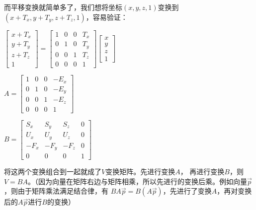 \documentclass[UTF8]{ctexart}
\begin{document}
而平移变换就简单多了，我们想将坐标$(x, y, z, 1)$变换到$(x+T_x, y+T_y, z+T_z, 1)$，容易验证：

$\begin{bmatrix} x+T_x \\ y+T_y \\ z+T_z \\ 1 \end{bmatrix} = \begin{bmatrix}
    1 & 0 & 0 & T_x \\ 
    0 & 1 & 0 & T_y \\ 
    0 & 0 & 1 & T_z \\ 
    0 & 0 & 0 & 1 
    \end{bmatrix} \begin{bmatrix} x \\ y \\ z \\ 1 \end{bmatrix}$

\vspace{3em}

$A = \begin{bmatrix} 1 & 0 & 0 & -E_x \\
            0 & 1 & 0 & -E_y \\
            0 & 0 & 1 & -E_z \\
            0   &   0 &    0 & 1 
\end{bmatrix}$

\vspace{3em}


$B = \begin{bmatrix} S_x & S_y & S_z & 0 \\
                     U_x & U_y & U_z & 0 \\
                     -F_x & -F_y & -F_z & 0 \\
                     0   &   0 &    0 & 1 

 \end{bmatrix}$

 \vspace {3em}

 将这两个变换组合到一起就成了$V$变换矩阵。先进行变换$A$，
 再进行变换$B$，则$V=BA$。（因为向量在矩阵右边与矩阵相乘，所以先进行的变换后乘。例如向量$\vec p$，则由于矩阵乘法满足结合律，有
 $BA\vec p = B(A\vec p)$，先进行了变换$A$，再对变换后的$A\vec p$进行$B$的变换）
\end{document}
